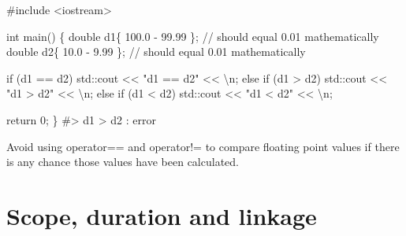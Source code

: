 \documentclass[
  letterpaper,
  DIV=11,
  numbers=noendperiod]{scrreprt}
\newenvironment{Shaded}{\begin{snugshade}}{\end{snugshade}}
\newcommand{\CommentTok}[1]{\textcolor[rgb]{0.37,0.37,0.37}{#1}}
\newcommand{\ControlFlowTok}[1]{\textcolor[rgb]{0.00,0.23,0.31}{#1}}
\newcommand{\DecValTok}[1]{\textcolor[rgb]{0.68,0.00,0.00}{#1}}
\newcommand{\ErrorTok}[1]{\textcolor[rgb]{0.68,0.00,0.00}{#1}}
\newcommand{\FloatTok}[1]{\textcolor[rgb]{0.68,0.00,0.00}{#1}}
\newcommand{\FunctionTok}[1]{\textcolor[rgb]{0.28,0.35,0.67}{#1}}
\newcommand{\NormalTok}[1]{\textcolor[rgb]{0.00,0.23,0.31}{#1}}
\newcommand{\SpecialCharTok}[1]{\textcolor[rgb]{0.37,0.37,0.37}{#1}}
\newcommand{\StringTok}[1]{\textcolor[rgb]{0.13,0.47,0.30}{#1}}
\begin{document}
\begin{Shaded}
\begin{Highlighting}[]
\CommentTok{\#include \textless{}iostream\textgreater{}}

\NormalTok{int }\FunctionTok{main}\NormalTok{()}
\NormalTok{\{}
\NormalTok{    double d1\{ }\FloatTok{100.0} \SpecialCharTok{{-}} \FloatTok{99.99}\NormalTok{ \}; }\SpecialCharTok{/}\ErrorTok{/}\NormalTok{ should equal }\FloatTok{0.01}\NormalTok{ mathematically}
\NormalTok{    double d2\{ }\FloatTok{10.0} \SpecialCharTok{{-}} \FloatTok{9.99}\NormalTok{ \}; }\SpecialCharTok{/}\ErrorTok{/}\NormalTok{ should equal }\FloatTok{0.01}\NormalTok{ mathematically}

    \ControlFlowTok{if}\NormalTok{ (d1 }\SpecialCharTok{==}\NormalTok{ d2)}
\NormalTok{        std}\SpecialCharTok{::}\NormalTok{cout }\SpecialCharTok{\textless{}}\ErrorTok{\textless{}} \StringTok{"d1 == d2"} \SpecialCharTok{\textless{}}\ErrorTok{\textless{}} \StringTok{\textquotesingle{}}\SpecialCharTok{\textbackslash{}n}\StringTok{\textquotesingle{}}\NormalTok{;}
    \ControlFlowTok{else} \ControlFlowTok{if}\NormalTok{ (d1 }\SpecialCharTok{\textgreater{}}\NormalTok{ d2)}
\NormalTok{        std}\SpecialCharTok{::}\NormalTok{cout }\SpecialCharTok{\textless{}}\ErrorTok{\textless{}} \StringTok{"d1 \textgreater{} d2"} \SpecialCharTok{\textless{}}\ErrorTok{\textless{}} \StringTok{\textquotesingle{}}\SpecialCharTok{\textbackslash{}n}\StringTok{\textquotesingle{}}\NormalTok{;}
    \ControlFlowTok{else} \ControlFlowTok{if}\NormalTok{ (d1 }\SpecialCharTok{\textless{}}\NormalTok{ d2)}
\NormalTok{        std}\SpecialCharTok{::}\NormalTok{cout }\SpecialCharTok{\textless{}}\ErrorTok{\textless{}} \StringTok{"d1 \textless{} d2"} \SpecialCharTok{\textless{}}\ErrorTok{\textless{}} \StringTok{\textquotesingle{}}\SpecialCharTok{\textbackslash{}n}\StringTok{\textquotesingle{}}\NormalTok{;}

\NormalTok{    return }\DecValTok{0}\NormalTok{;}
\NormalTok{\}}
\CommentTok{\#\textgreater{} d1 \textgreater{} d2  : error}
\end{Highlighting}
\end{Shaded}

Avoid using operator== and operator!= to compare floating point values
if there is any chance those values have been calculated.


\hypertarget{scope-duration-and-linkage}{%
\chapter{Scope, duration and linkage}\label{scope-duration-and-linkage}}
\end{document}
